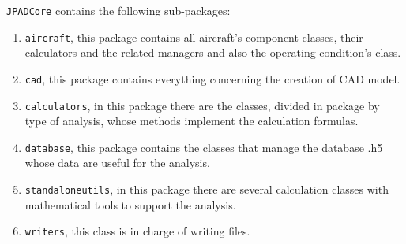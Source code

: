 \bigskip
\noindent
\lstinline[language=Java]!JPADCore! contains the following sub-packages:
%
\begin{enumerate}
\item \lstinline[language=Java]!aircraft!, this package contains all aircraft's component classes, their calculators and the related managers and also the operating condition's class.
\item \lstinline[language=Java]!cad!, this package contains everything concerning the creation of CAD model.
\item \lstinline[language=Java]!calculators!, in this package there are the classes, divided in package by type of analysis, whose methods implement the calculation formulas.
\item \lstinline[language=Java]!database!, this package contains the classes that manage the database .h5 whose data are useful for the analysis. 
\item \lstinline[language=Java]!standaloneutils!, in this package there are several calculation classes with mathematical tools to support the analysis.
\item \lstinline[language=Java]!writers!, this class is in charge of writing files.
\end{enumerate}
%

